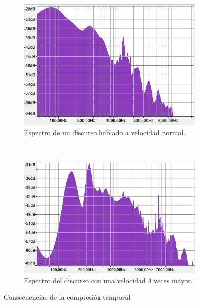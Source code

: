 \begin{figure}[H]
	\centering
	\begin{subfigure}[b]{0.4\linewidth}
		\centering
		\includegraphics[scale=0.5]{ImagenesEjercicio5/HumanSpeechNormalSpeed.PNG}
		\caption{Espectro de un discurso hablado a velocidad normal.}
		\label{fig:speechNormal}
	\end{subfigure}
	~
	\begin{subfigure}[b]{0.4\linewidth}
		\centering
		\includegraphics[scale=0.5]{ImagenesEjercicio5/HumanSpeech4X.PNG}
		\caption{Espectro del discurso con una velocidad 4 veces mayor.}
		\label{fig:speech4X}
	\end{subfigure}
	\caption{Consecuencias de la compresión temporal}
\end{figure}

